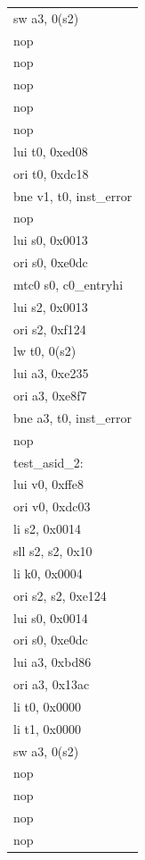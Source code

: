 \documentclass[11pt,utf8]{article}
\begin{document}
{{{\begin{center}
\begin{longtable}{p{15cm}}
{ }{ }{ }{ }sw{ }a3,{ }0(s2)\\
{ }{ }{ }{ }nop\\
{ }{ }{ }{ }nop\\
{ }{ }{ }{ }nop\\
{ }{ }{ }{ }nop\\
{ }{ }{ }{ }nop\\
{ }{ }{ }{ }lui{ }t0,{ }0xed08\\
{ }{ }{ }{ }ori{ }t0,{ }0xdc18\\
{ }{ }{ }{ }bne{ }v1,{ }t0,{ }inst\_error\\
{ }{ }{ }{ }nop\\
{ }{ }{ }{ }lui{ }s0,{ }0x0013\\
{ }{ }{ }{ }ori{ }s0,{ }0xe0dc\\
{ }{ }{ }{ }mtc0{ }s0,{ }c0\_entryhi\\
{ }{ }{ }{ }lui{ }s2,{ }0x0013\\
{ }{ }{ }{ }ori{ }s2,{ }0xf124\\
{ }{ }{ }{ }lw{ }t0,{ }0(s2)\\
{ }{ }{ }{ }lui{ }a3,{ }0xe235\\
{ }{ }{ }{ }ori{ }a3,{ }0xe8f7\\
{ }{ }{ }{ }bne{ }a3,{ }t0,{ }inst\_error\\
{ }{ }{ }{ }nop\\
test\_asid\_2:\\
{ }{ }{ }{ }lui{ }v0,{ }0xffe8\\
{ }{ }{ }{ }ori{ }v0,{ }0xdc03\\
{ }{ }{ }{ }li{ }s2,{ }0x0014\\
{ }{ }{ }{ }sll{ }s2,{ }s2,{ }0x10\\
{ }{ }{ }{ }li{ }k0,{ }0x0004\\
{ }{ }{ }{ }ori{ }s2,{ }s2,{ }0xe124\\
{ }{ }{ }{ }lui{ }s0,{ }0x0014\\
{ }{ }{ }{ }ori{ }s0,{ }0xe0dc\\
{ }{ }{ }{ }lui{ }a3,{ }0xbd86\\
{ }{ }{ }{ }ori{ }a3,{ }0x13ac\\
{ }{ }{ }{ }li{ }t0,{ }0x0000\\
{ }{ }{ }{ }li{ }t1,{ }0x0000\\
{ }{ }{ }{ }sw{ }a3,{ }0(s2)\\
{ }{ }{ }{ }nop\\
{ }{ }{ }{ }nop\\
{ }{ }{ }{ }nop\\
{ }{ }{ }{ }nop\\

\end{longtable}
\end{center}}}}
\end{document}
